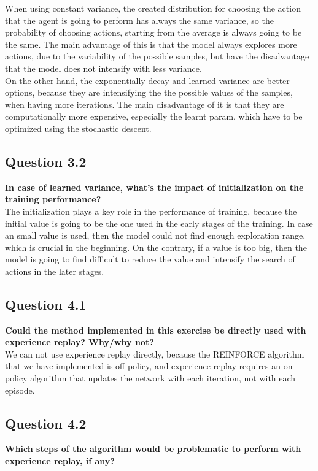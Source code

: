 \documentclass[12pt]{article}
\begin{document}
When using constant variance, the created distribution for choosing the action that the agent is going to perform has always the same variance, so the probability of choosing actions, starting from the average is always going to be the same. The main advantage of this is that the model always explores more actions, due to the variability of the possible samples, but have the disadvantage that the model does not intensify with less variance.\\

On the other hand, the exponentially decay and learned variance are better options, because they are intensifying the the possible values of the samples, when having more iterations. The main disadvantage of it is that they are computationally more expensive, especially the learnt param, which have to be optimized using the stochastic descent.

\subsection{Question 3.2}
\textbf{In case of learned variance, what’s the impact of initialization on the training performance?}\\

The initialization plays a key role in the performance of training, because the initial value is going to be the one used in the early stages of the training. In case an small value is used, then the model could not find enough exploration range, which is crucial in the beginning. On the contrary, if a value is too big, then the model is going to find difficult to reduce the value and intensify the search of actions in the later stages.

\subsection{Question 4.1}
\textbf{Could the method implemented in this exercise be directly used with experience replay? Why/why not?}\\

We can not use experience replay directly, because the REINFORCE algorithm that we have implemented is off-policy, and experience replay requires an on-policy algorithm that updates the network with each iteration, not with each episode.

\subsection{Question 4.2}
\textbf{Which steps of the algorithm would be problematic to perform with experience replay, if any?}\\
\end{document}
